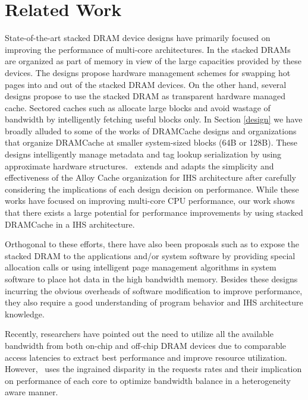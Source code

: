 \section{Related Work} \label{related-work}
State-of-the-art stacked DRAM device designs have primarily focused on improving the performance of multi-core architectures. %
In \cite{pom,cameo} the stacked DRAMs are organized as part of memory in view of the large capacities provided by these devices. The designs propose hardware management schemes for swapping hot pages into and out of the stacked DRAM devices.
On the other hand, several designs propose to use the stacked DRAM as transparent hardware managed cache. Sectored caches such as \cite{footprint,unison-cache} allocate large blocks and avoid wastage of bandwidth by intelligently fetching useful blocks only. In Section \ref{design} we have broadly alluded to some of the works of DRAMCache designs and organizations \cite{alloy,atcache,bimodal,loh-hill} that organize DRAMCache at smaller system-sized blocks (64B or 128B).
These designs intelligently manage metadata and tag lookup serialization by using approximate hardware structures. \cachename\ extends and adapts the simplicity and effectiveness of the Alloy Cache organization for IHS architecture after carefully considering the implications of each design decision on performance. 
While these works have focused on improving multi-core CPU performance, our work shows that there exists a large potential for performance improvements by using stacked DRAMCache in a IHS architecture. 
\par Orthogonal to these efforts, there have also been proposals such as \cite{software-dram} to expose the stacked DRAM to the applications and/or system software by providing special allocation calls or using intelligent page management algorithms in system software to place hot data in the high bandwidth memory. Besides these designs incurring the obvious overheads of software modification to improve performance, they also require a good understanding of program behavior and IHS architecture knowledge.
\par Recently, researchers have pointed out the need to utilize all the available bandwidth from both on-chip and off-chip DRAM devices due to comparable access latencies \cite{mostly-clean,mainak-hpca,bear,micro-refresh} to extract best performance and improve resource utilization. However, \cachename\ uses the ingrained disparity in the requests rates and their implication on performance of each core to optimize bandwidth balance in a heterogeneity aware manner. 
